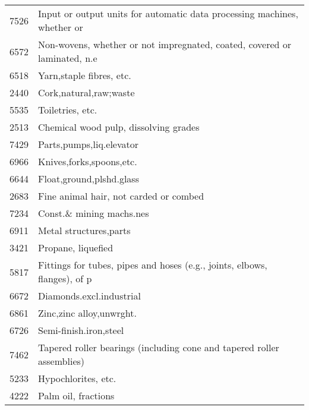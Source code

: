 \documentclass[class=article, crop=false]{standalone}
\begin{document}
\begin{longtable}{ll}
	7526          & Input or output units for automatic data processing machines, whether or  \\
	6572          & Non-wovens, whether or not impregnated, coated, covered or laminated, n.e \\
	6518          & Yarn,staple fibres, etc.                                                  \\
	2440          & Cork,natural,raw;waste                                                    \\
	5535          & Toiletries, etc.                                                          \\
	2513          & Chemical wood pulp, dissolving grades                                     \\
	7429          & Parts,pumps,liq.elevator                                                  \\
	6966          & Knives,forks,spoons,etc.                                                  \\
	6644          & Float,ground,plshd.glass                                                  \\
	2683          & Fine animal hair, not carded or combed                                    \\
	7234          & Const.\& mining machs.nes                                                 \\
	6911          & Metal structures,parts                                                    \\
	3421          & Propane, liquefied                                                        \\
	5817          & Fittings for tubes, pipes and hoses (e.g., joints, elbows, flanges), of p \\
	6672          & Diamonds.excl.industrial                                                  \\
	6861          & Zinc,zinc alloy,unwrght.                                                  \\
	6726          & Semi-finish.iron,steel                                                    \\
	7462          & Tapered roller bearings (including cone and tapered roller assemblies)    \\
	5233          & Hypochlorites, etc.                                                       \\
	4222          & Palm oil, fractions                                                       \\

\end{longtable}
\end{document}
